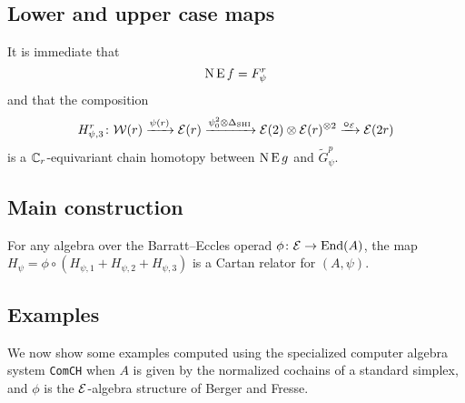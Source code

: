 \subsection{Lower and upper case maps}

It is immediate that
\[
\operatorname{N}\operatorname{E} f = F_\psi^r
\]
and that the composition
\[
H_{\psi,3}^r \colon \mathcal{W}(r) \xrightarrow{\psi(r)} \mathcal{E}(r) \xrightarrow{\psi^2_0 \otimes \Delta_{\mathrm{SHI}}} \mathcal{E}(2) \otimes \mathcal{E}(r)^{\otimes 2} \xrightarrow{\bm{\circ}_{\mathcal{E}}} \mathcal{E}(2r)
\]
is a $\mathbb{C}_r$-equivariant chain homotopy between $\operatorname{N}\operatorname{E} g$ and $\widetilde G_\psi^p$.

\subsection{Main construction}

\begin{theorem}
	For any algebra over the Barratt--Eccles operad $\phi \colon \mathcal{E} \to \mathrm{End}(A)$, the map $H_\psi = \phi \circ (H_{\psi,1} + H_{\psi,2} + H_{\psi,3})$ is a Cartan relator for $(A,\psi)$.
\end{theorem}

\subsection{Examples}

We now show some examples computed using the specialized computer algebra system \texttt{ComCH} \cite{medina2021comch} when $A$ is given by the normalized cochains of a standard simplex, and $\phi$ is the $\mathcal{E}$-algebra structure of Berger and Fresse.
